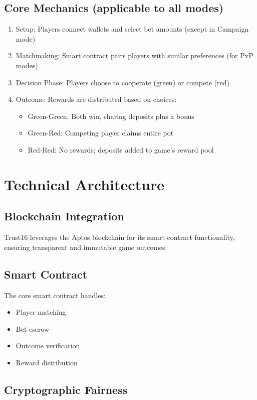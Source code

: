 \documentclass[]{article}
\begin{document}
\subsection{Core Mechanics (applicable to all modes)}

\begin{enumerate}
\item Setup: Players connect wallets and select bet amounts (except in Campaign mode)
\item Matchmaking: Smart contract pairs players with similar preferences (for PvP modes)
\item Decision Phase: Players choose to cooperate (green) or compete (red)
\item Outcome: Rewards are distributed based on choices:
  \begin{itemize}
  \item Green-Green: Both win, sharing deposits plus a bonus
  \item Green-Red: Competing player claims entire pot
  \item Red-Red: No rewards; deposits added to game's reward pool
  \end{itemize}
\end{enumerate}

\section{Technical Architecture}

\subsection{Blockchain Integration}

Trust16 leverages the Aptos blockchain for its smart contract functionality, ensuring transparent and immutable game outcomes.

\subsection{Smart Contract}

The core smart contract handles:
\begin{itemize}
\item Player matching
\item Bet escrow
\item Outcome verification
\item Reward distribution
\end{itemize}

\subsection{Cryptographic Fairness}
\end{document}
